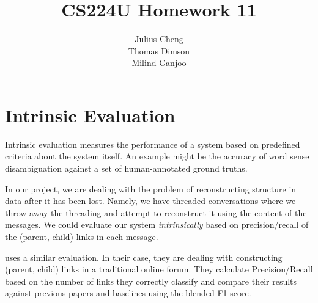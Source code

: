 \documentclass{article}
\title{CS224U Homework 11}
\author{
Julius Cheng\\
Thomas Dimson\\
Milind Ganjoo
}
\begin{document}
\maketitle

\section*{Intrinsic Evaluation}
Intrinsic evaluation measures the performance of a system
based on predefined criteria about the system itself. An example
might be the accuracy of word sense disambiguation against
a set of human-annotated ground truths. 

In our project, we are dealing with the problem of reconstructing
structure in data after it has been lost. Namely, we have threaded
conversations where we throw away the threading and attempt to 
reconstruct it using the content of the messages. We could evaluate
our system \textit{intrinsically} based on precision/recall of the 
(parent, child) links in each message.

\cite{Aumayr2011a} uses a similar evaluation. In their case,
they are dealing with constructing (parent, child) links in a traditional
online forum. They calculate Precision/Recall based on the number of 
links they correctly classify and compare their results against previous
papers and baselines using the blended F1-score.

\section*{}

{} 

\end{document}

